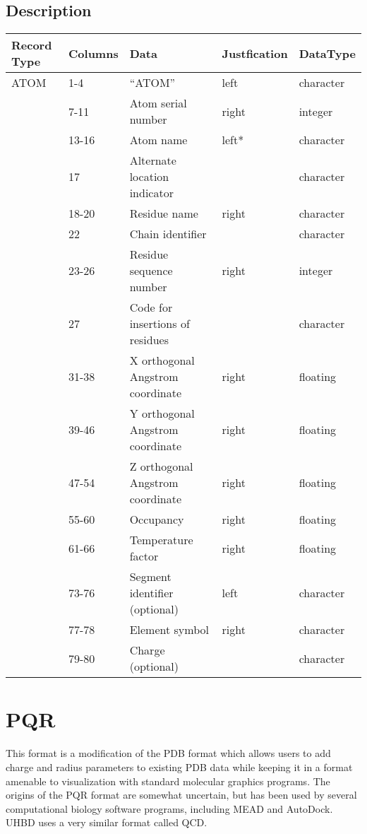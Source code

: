 \documentclass[letterpaper,10pt,english]{sphinxmanual}
\begin{document}
\subsection{Description}
\label{documentation_pages/file_format:description}
\begin{tabulary}{\linewidth}{|L|L|L|L|L|}
\hline
\textbf{
Record Type
} & \textbf{
Columns
} & \textbf{
Data
} & \textbf{
Justfication
} & \textbf{
DataType
}\\
\hline

ATOM
 & 
1-4
 & 
``ATOM''
 & 
left
 & 
character
\\
 & 
7-11
 & 
Atom serial number
 & 
right
 & 
integer
\\
 & 
13-16
 & 
Atom name
 & 
left*
 & 
character
\\
 & 
17
 & 
Alternate location indicator
 &  & 
character
\\
 & 
18-20
 & 
Residue name
 & 
right
 & 
character
\\
 & 
22
 & 
Chain identifier
 &  & 
character
\\
 & 
23-26
 & 
Residue sequence number
 & 
right
 & 
integer
\\
 & 
27
 & 
Code for insertions of residues
 &  & 
character
\\
 & 
31-38
 & 
X orthogonal Angstrom coordinate
 & 
right
 & 
floating
\\
 & 
39-46
 & 
Y orthogonal Angstrom coordinate
 & 
right
 & 
floating
\\
 & 
47-54
 & 
Z orthogonal Angstrom coordinate
 & 
right
 & 
floating
\\
 & 
55-60
 & 
Occupancy
 & 
right
 & 
floating
\\
 & 
61-66
 & 
Temperature factor
 & 
right
 & 
floating
\\
 & 
73-76
 & 
Segment identifier (optional)
 & 
left
 & 
character
\\
 & 
77-78
 & 
Element symbol
 & 
right
 & 
character
\\
 & 
79-80
 & 
Charge (optional)
 &  & 
character
\\
\hline
\end{tabulary}



\section{PQR}
\label{documentation_pages/file_format:pqr}
This format is a modification of the PDB format which allows users to add charge
and radius parameters to existing PDB data while keeping it in a format amenable
to visualization with standard molecular graphics programs. The origins of the PQR
format are somewhat uncertain, but has been used by several computational biology
software programs, including MEAD and AutoDock. UHBD uses a very similar format
called QCD.
\end{document}
